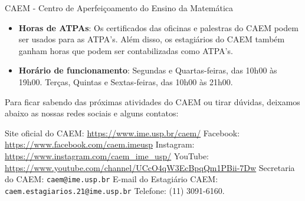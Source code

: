 \begin{secao}{CAEM - Centro de Aperfeiçoamento do Ensino da Matemática}
\begin{itemize}
\item \textbf{Horas de ATPAs}: Os certificados das oficinas e palestras
do CAEM podem ser usados para as ATPA's. Além disso, os estagiários do
CAEM também ganham horas que podem ser contabilizadas como ATPA's.

\item \textbf{Horário de funcionamento}: Segundas e Quartas-feiras,
  das 10h00 às 19h00. Terças, Quintas e Sextas-feiras, das 10h00 às
  21h00.
  
\end{itemize}

Para ficar sabendo das próximas atividades do CAEM ou tirar dúvidas,
deixamos abaixo as nossas redes sociais e alguns contatos:

Site oficial do CAEM: \url{https://www.ime.usp.br/caem/}
Facebook: \url{https://www.facebook.com/caem.imeusp}
Instagram: \url{https://www.instagram.com/caem_ime_usp/}
YouTube: \url{https://www.youtube.com/channel/UCcO4qW3EcBpqQm1PBii-7Dw}
Secretaria do CAEM: \texttt{caem@ime.usp.br}
E-mail do Estagiário CAEM: \texttt{caem.estagiarios.21@ime.usp.br}
Telefone: (11) 3091-6160.

\end{secao}
